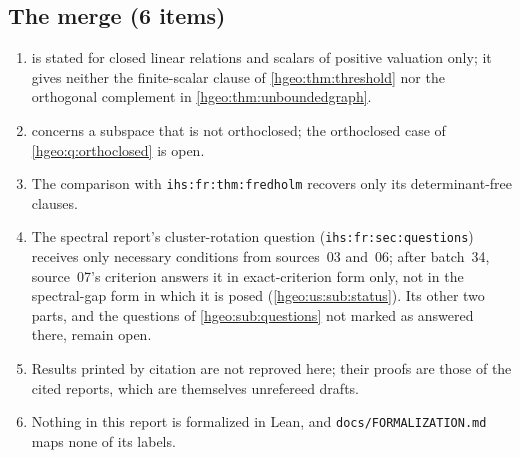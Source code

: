 \documentclass[11pt,letterpaper]{article}
\numberwithin{equation}{section}
\theoremstyle{definition}
\theoremstyle{remark}
\newcommand{\replabel}[1]{\nolinkurl{#1}}
\newcommand{\fn}[1]{\nolinkurl{#1}}
\begin{document}
\subsection{The merge (6 items)}
\begin{enumerate}[leftmargin=*,widest=00,label=M.\arabic*]
\item {} is stated for closed linear relations and
scalars of positive valuation only; it gives neither the finite-scalar clause
of \cref{hgeo:thm:threshold} nor the orthogonal complement in
\cref{hgeo:thm:unboundedgraph}.
\item {} concerns a subspace that is not
orthoclosed; the orthoclosed case of \cref{hgeo:q:orthoclosed} is open.
\item The comparison with \replabel{ihs:fr:thm:fredholm} recovers only its
determinant-free clauses.
\item The spectral report's cluster-rotation question
(\replabel{ihs:fr:sec:questions}) receives only necessary conditions from
sources~03 and~06; after batch~34, source~07's criterion answers it in
exact-criterion form only, not in the spectral-gap form in which it is posed
(\cref{hgeo:us:sub:status}). Its other two parts, and the questions of
\cref{hgeo:sub:questions} not marked as answered there, remain open.
\item Results printed by citation are not reproved here; their proofs are
those of the cited reports, which are themselves unrefereed drafts.
\item Nothing in this report is formalized in Lean, and
\fn{docs/FORMALIZATION.md} maps none of its labels.
\end{enumerate}
\end{document}
